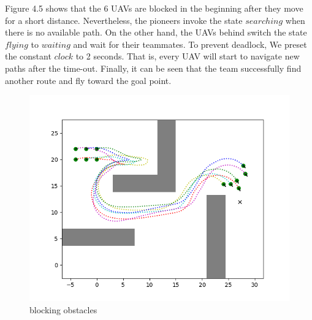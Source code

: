 Figure 4.5 shows that the 6 UAVs are blocked in the beginning after they move for a short distance. Nevertheless, the pioneers invoke the state $searching$ when there is no available path. On the other hand, the UAVs behind switch the state $flying$ to $waiting$ and wait for their teammates. To prevent deadlock, We preset the constant $clock$ to 2 seconds. That is, every UAV will start to navigate new paths after the time-out. Finally, it can be seen that the team successfully find another route and fly toward the goal point.

\begin{figure}[H]
    \centering
    \includegraphics[scale=1]{figures/comprehensive_simulation_2.png}
    \caption{blocking obstacles}
    \label{fig:fig_label}
\end{figure}




